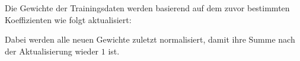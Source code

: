 Die Gewichte der Trainingsdaten werden basierend auf
dem zuvor bestimmten Koeffizienten wie folgt aktualisiert:

Dabei werden alle neuen Gewichte zuletzt normalisiert,
damit ihre Summe nach der Aktualisierung wieder $1$ ist.

